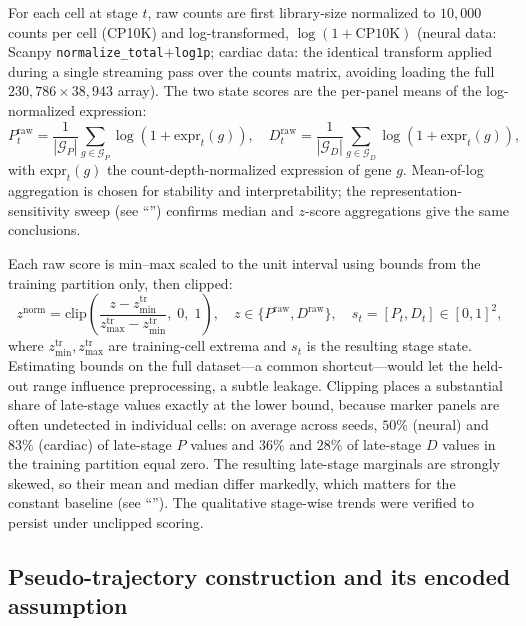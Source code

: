 \documentclass[10pt,letterpaper]{article}
\begin{document}
For each cell at stage $t$, raw counts are first library-size normalized to $10{,}000$ counts per cell (CP10K) and log-transformed, $\log(1+\mathrm{CP10K})$ (neural data: Scanpy \texttt{normalize\_total}+\texttt{log1p}; cardiac data: the identical transform applied during a single streaming pass over the counts matrix, avoiding loading the full $230{,}786\times 38{,}943$ array). The two state scores are the per-panel means of the log-normalized expression:
\begin{equation}
P^{\mathrm{raw}}_t = \frac{1}{|\mathcal{G}_P|}\sum_{g\in\mathcal{G}_P}\log\!\left(1+\mathrm{expr}_t(g)\right), \quad
D^{\mathrm{raw}}_t = \frac{1}{|\mathcal{G}_D|}\sum_{g\in\mathcal{G}_D}\log\!\left(1+\mathrm{expr}_t(g)\right),
\label{eq:marker_scores}
\end{equation}
with $\mathrm{expr}_t(g)$ the count-depth-normalized expression of gene $g$. Mean-of-log aggregation is chosen for stability and interpretability; the representation-sensitivity sweep (see ``'') confirms median and $z$-score aggregations give the same conclusions.

Each raw score is min--max scaled to the unit interval using bounds from the training partition only, then clipped:
\begin{equation}
z^{\mathrm{norm}} = \mathrm{clip}\!\left(\frac{z - z_{\min}^{\mathrm{tr}}}{z_{\max}^{\mathrm{tr}} - z_{\min}^{\mathrm{tr}}},\;0,\;1\right), \quad z\in\{P^{\mathrm{raw}},D^{\mathrm{raw}}\}, \quad s_t=[P_t,D_t]\in[0,1]^2,
\label{eq:minmax_clip}
\end{equation}
where $z_{\min}^{\mathrm{tr}},z_{\max}^{\mathrm{tr}}$ are training-cell extrema and $s_t$ is the resulting stage state. Estimating bounds on the full dataset---a common shortcut---would let the held-out range influence preprocessing, a subtle leakage. Clipping places a substantial share of late-stage values exactly at the lower bound, because marker panels are often undetected in individual cells: on average across seeds, $50\%$ (neural) and $83\%$ (cardiac) of late-stage $P$ values and $36\%$ and $28\%$ of late-stage $D$ values in the training partition equal zero. The resulting late-stage marginals are strongly skewed, so their mean and median differ markedly, which matters for the constant baseline (see ``''). The qualitative stage-wise trends were verified to persist under unclipped scoring.

\subsection*{Pseudo-trajectory construction and its encoded assumption}
\label{subsec:traj}
\end{document}
